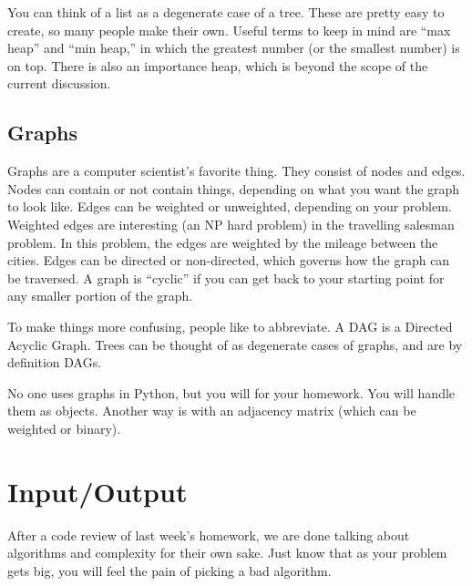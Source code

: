 \documentclass[12pt,letter]{article}
\begin{document}
You can think of a list as a degenerate case of a tree. These are
pretty easy to create, so many people make their own. Useful terms to
keep in mind are ``max heap'' and ``min heap,'' in which the greatest
number (or the smallest number) is on top. There is also an importance
heap, which is beyond the scope of the current discussion.

\subsection{Graphs}

Graphs are a computer scientist's favorite thing. They consist of
nodes and edges. Nodes can contain or not contain things, depending on
what you want the graph to look like. Edges can be weighted or
unweighted, depending on your problem. Weighted edges are interesting
(an NP hard problem) in the travelling salesman problem. In this
problem, the edges are weighted by the mileage between the
cities. Edges can be directed or non-directed, which governs how the
graph can be traversed. A graph is ``cyclic'' if you can get back to
your starting point for any smaller portion of the graph.

To make things more confusing, people like to abbreviate. A DAG is a
Directed Acyclic Graph. Trees can be thought of as degenerate cases of
graphs, and are by definition DAGs.

No one uses graphs in Python, but you will for
your homework. You will handle them as objects. Another way is with an adjacency matrix (which can be
weighted or binary). 


\section{Input/Output}





After a code review of last week's homework, we are done talking about
algorithms and complexity for their own sake. Just know that as your
problem gets big, you will feel the pain of picking a bad algorithm. 
\end{document}
